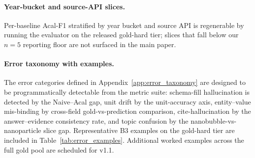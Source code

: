 \documentclass{article}
\begin{document}
\paragraph{Year-bucket and source-API slices.}
Per-baseline Acal-F1 stratified by year bucket and source API is
regenerable by running the evaluator on the released gold-hard tier;
slices that fall below our $n=5$ reporting floor are not surfaced in
the main paper.

\paragraph{Error taxonomy with examples.}
The error categories defined in Appendix~\ref{app:error_taxonomy} are
designed to be programmatically detectable from the metric suite:
schema-fill hallucination is detected by the Naive--Acal gap, unit
drift by the unit-accuracy axis, entity--value mis-binding by
cross-field gold-vs-prediction comparison, cite-hallucination by the
answer--evidence consistency rate, and topic confusion by the
nanobubble-vs-nanoparticle slice gap. Representative B3 examples on
the gold-hard tier are included in Table~\ref{tab:error_examples}.
Additional worked examples across the full gold pool are scheduled for
v1.1.

\newpage

\end{document}
